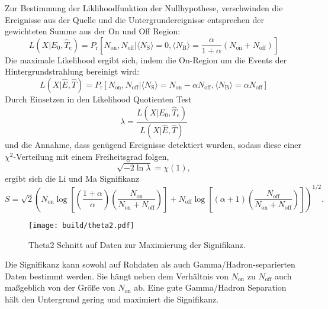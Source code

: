 Zur Bestimmung der Liklihoodfunktion der Nullhypothese,
verschwinden die
Ereignisse aus der Quelle und die Untergrundereignisse entsprechen der
gewichteten Summe aus der On und Off Region:
\begin{equation}
	L(X|E_0, \hat{T}_\text{c})= P_\text{r} \left[
		N_\text{on}, N_\text{off} |
		\langle N_\text{S} \rangle = 0,
		\langle N_\text{B} \rangle = \frac{\alpha}{1 + \alpha} (N_\text{on} +
			N_\text{off})
	\right]
\end{equation}
Die maximale Likelihood ergibt sich, indem die On-Region
um die Events der Hintergrundstrahlung bereinigt wird:
\begin{equation}
	L(X|\hat{E}, \hat{T})= P_\text{r} \left[
		N_\text{on}, N_\text{off} |
		\langle N_\text{S} \rangle = N_\text{on} - \alpha N_\text{off},
		\langle N_\text{B} \rangle = \alpha N_\text{off}
	\right]
\end{equation}
Durch Einsetzen in den Likelihood Quotienten Test
\begin{equation}
	\lambda = \frac{L(X|E_0, \hat{T}_\text{c})}{L(X|\hat{E}, \hat{T})}
\end{equation}
und die Annahme, dass genügend Ereignisse detektiert wurden, sodass diese einer
$\chi^2$-Verteilung mit einem Freiheitsgrad folgen,
\begin{equation}
	\sqrt{- 2 \ln \lambda} = \chi(1),
\end{equation}
ergibt sich die Li und Ma Signifikanz
\begin{equation}
  S = \sqrt{2} {\left(
      N_\text{on} \log \left[
        \left( \frac{1 + \alpha}{\alpha} \right) \left(
          \frac{N_\text{on}}{N_\text{on} + N_\text{off}}
        \right)
      \right]
      + N_\text{off} \log \left[
        (\alpha + 1) \left(
          \frac{N_\text{off}}{N_\text{on} + N_\text{off}}
        \right)
      \right]
  \right)} ^ {1/2}.
\end{equation}

\begin{wrapfigure}[13]{L}{0.45\textwidth}
		\centering
		\texttt{[image: build/theta2.pdf]}
		\caption{Theta2 Schnitt auf Daten zur Maximierung der Signifikanz.}%
		\label{fig:thetacut}
\end{wrapfigure}

Die Signifikanz kann sowohl auf Rohdaten als auch Gamma/Hadron-separierten Daten
bestimmt werden.
Sie hängt neben dem Verhältnis von $N_\text{on}$ zu $N_\text{off}$ auch
maßgeblich von der Größe von $N_\text{on}$ ab.
Eine gute Gamma/Hadron Separation hält den Untergrund gering und maximiert die
Signifikanz.

